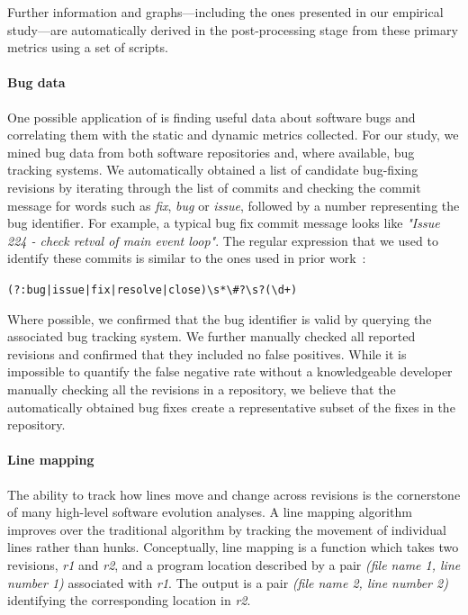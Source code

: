 Further information and graphs---including the ones presented in our
empirical study---are automatically derived in the post-processing
stage from these primary metrics using a set of scripts.




\paragraph{Bug data} One possible application of \covrig is finding
useful data about software bugs and correlating them with the static
and dynamic metrics collected. For our study, we mined bug data from
both software repositories and, where available, bug tracking systems.
We automatically obtained a list of candidate bug-fixing revisions by
iterating through the list of commits and checking the commit message
for words such as {\em fix}, {\em bug} or {\em issue}, followed by a
number representing the bug identifier.  For example, a typical
\memcached bug fix commit message looks like {\em "Issue 224 - check
  retval of main event loop"}. The regular expression that we used to
identify these commits is similar to the ones used in prior
work~\cite{genealogies:issre13}:

\lstinline`(?:bug|issue|fix|resolve|close)\s*\#?\s?(\d+)`

Where possible, we confirmed that the bug identifier is valid by
querying the associated bug tracking system. We further manually
checked all reported revisions and confirmed that they included no
false positives.  While it is impossible to quantify the false
negative rate without a knowledgeable developer manually checking all
the revisions in a repository, we believe that the automatically
obtained bug fixes create a representative subset of the fixes in the
repository.

\paragraph{Line mapping} The ability to track how lines move and change
across revisions is the cornerstone of many high-level software
evolution analyses.  A line mapping algorithm improves over the
traditional \diff algorithm by tracking the movement of individual
lines rather than hunks.  Conceptually, line mapping is a function
which takes two revisions, \textit{r1} and \textit{r2}, and a program
location described by a pair \textit{(file name 1, line number 1)}
associated with \textit{r1}.  The output is a pair \textit{(file name
  2, line number 2)} identifying the corresponding location in
\textit{r2}.


